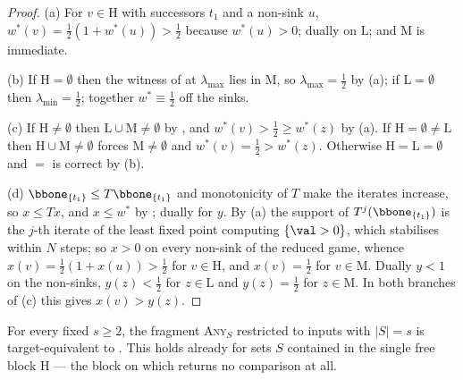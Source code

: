 \begin{proof}
(a) For $v\in\mathrm H$ with successors $t_1$ and a non-sink $u$,
$w^\ast(v)=\tfrac12(1+w^\ast(u))>\tfrac12$ because $w^\ast(u)>0$; dually on
$\mathrm L$; and $\mathrm M$ is immediate.

(b) If $\mathrm H=\emptyset$ then the witness of  at
$\lambda_{\max}$ lies in $\mathrm M$, so $\lambda_{\max}=\tfrac12$ by (a); if
$\mathrm L=\emptyset$ then $\lambda_{\min}=\tfrac12$; together
$w^\ast\equiv\tfrac12$ off the sinks.

(c) If $\mathrm H\ne\emptyset$ then $\mathrm L\cup\mathrm M\ne\emptyset$ by
, and $w^\ast(v)>\tfrac12\ge w^\ast(z)$ by (a). If
$\mathrm H=\emptyset\ne\mathrm L$ then $\mathrm H\cup\mathrm M\ne\emptyset$
forces $\mathrm M\ne\emptyset$ and $w^\ast(v)=\tfrac12>w^\ast(z)$. Otherwise
$\mathrm H=\mathrm L=\emptyset$ and $=$ is correct by (b).

(d) $\bbone_{\{t_1\}}\le T\bbone_{\{t_1\}}$ and monotonicity of $T$ make the
iterates increase, so $x\le Tx$, and $x\le w^\ast$ by ;
dually for $y$. By (a) the support of
$T^{j}(\bbone_{\{t_1\}})$ is the $j$-th iterate of the least fixed point
computing $\{\val>0\}$, which stabilises within $N$ steps; so $x>0$ on every
non-sink of the reduced game, whence $x(v)=\tfrac12(1+x(u))>\tfrac12$ for
$v\in\mathrm H$, and $x(v)=\tfrac12$ for $v\in\mathrm M$. Dually $y<1$ on the
non-sinks, $y(z)<\tfrac12$ for $z\in\mathrm L$ and $y(z)=\tfrac12$ for
$z\in\mathrm M$. In both branches of (c) this gives $x(v)>y(z)$.
\end{proof}

\begin{theorem}\label{thm:wo-any-set}
For every fixed $s\ge2$, the fragment \textsc{Any}$_S$ restricted to inputs
with $|S|=s$ is target-equivalent to . This holds already for
sets $S$ contained in the single free block $\mathrm H$ --- the block on which
 returns no comparison at all.
\end{theorem}

